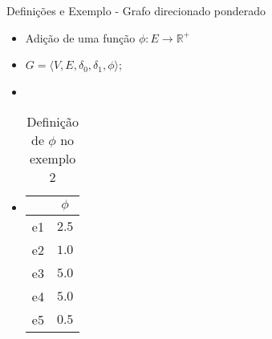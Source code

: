\begin{frame}{Definições e Exemplo - Grafo direcionado ponderado}
    \begin{itemize}
        \item Adição de uma função $\phi : E \rightarrow \mathbb{R}^+$
        \item $G = \langle V,E,\delta_0, \delta_1, \phi \rangle$;
        \item[]
        \item[] 
        \begin{table}[htbp]
            \centering
            \begin{tabular}{|c|c|}
                \hline
                & $\phi$ \\
                \hline
                e1 & $2.5$ \\
                \hline
                e2 & $1.0$ \\
                \hline
                e3 & $5.0$ \\
                \hline
                e4 & $5.0$ \\
                \hline
                e5 & $0.5$ \\
                \hline
            \end{tabular}
            \caption[Definição de $\phi$ no Exemplo 2]{Definição de $\phi$ no exemplo 2}
            \label{tab:Grafo2}
        \end{table}
    \end{itemize}
\end{frame}
